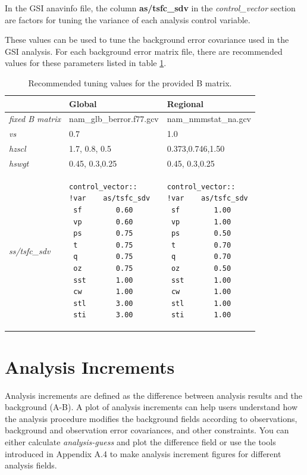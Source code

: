 In the GSI anavinfo file, the column \textbf{as/tsfc\_sdv} in the \textit{control\_vector} section are factors for tuning the variance of each analysis control variable.

These values can be used to tune the background error covariance used in the GSI analysis. For each background error matrix file, there are recommended values for these parameters listed in table \ref{tab411}.

\begin{table}[htbp]
\centering
\caption{Recommended tuning values for the provided B matrix.}
\begin{tabular}{|p{2cm}|p{5cm}|p{5cm}|}
\hline
\hline
  & Global & Regional   \\
\hline
\textit{fixed B matrix} & nam\_glb\_berror.f77.gcv & nam\_nmmstat\_na.gcv \\
\hline
\textit{vs} & 0.7 & 1.0\\
\hline
\textit{hzscl} & 1.7, 0.8, 0.5 & 0.373,0.746,1.50\\
\hline
\textit{hswgt} & 0.45, 0.3,0.25 & 0.45, 0.3,0.25\\
\hline
\textit{ss/tsfc\_sdv} & 
\begin{verbatim}
control_vector:: 
!var    as/tsfc_sdv
 sf        0.60
 vp        0.60
 ps        0.75
 t         0.75
 q         0.75
 oz        0.75
 sst       1.00
 cw        1.00
 stl       3.00
 sti       3.00
\end{verbatim}
 & 
\begin{verbatim}
control_vector::
!var    as/tsfc_sdv
 sf        1.00
 vp        1.00
 ps        0.50
 t         0.70
 q         0.70
 oz        0.50
 sst       1.00
 cw        1.00
 stl       1.00
 sti       1.00
\end{verbatim}
\\
\hline
\end{tabular}
\label{tab411}
\end{table} 

\section{Analysis Increments}

Analysis increments are defined as the difference between analysis results and the background (A-B). A plot of analysis increments can help users understand how the analysis procedure modifies the background fields according to observations, background and observation error covariances, and other constraints. You can either calculate \textit{analysis-guess} and plot the difference field or use the tools introduced in Appendix A.4 to make analysis increment figures for different analysis fields.

